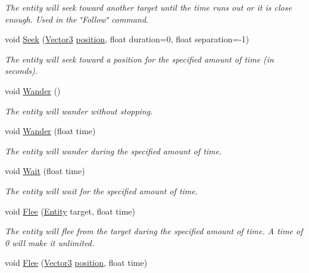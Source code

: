 \begin{DoxyCompactItemize}
\begin{DoxyCompactList}\small\item\em The entity will seek toward another target until the time runs out or it is close enough. Used in the \char`\"{}\+Follow\char`\"{} command. \end{DoxyCompactList}\item 
void \mbox{\hyperlink{class_lua_1_1_entity_a1a0205dc1d6ab6ac54679970885490f9}{Seek}} (\mbox{\hyperlink{class_lua_1_1_vector3}{Vector3}} \mbox{\hyperlink{class_lua_1_1_entity_ad8bd97d98fddc9b89f8410512b502c3f}{position}}, float duration=0, float separation=-\/1)
\begin{DoxyCompactList}\small\item\em The entity will seek toward a position for the specified amount of time (in seconds). \end{DoxyCompactList}\item 
void \mbox{\hyperlink{class_lua_1_1_entity_aa4d1d044edd1f9b9dfb4b310c49b8761}{Wander}} ()
\begin{DoxyCompactList}\small\item\em The entity will wander without stopping. \end{DoxyCompactList}\item 
void \mbox{\hyperlink{class_lua_1_1_entity_a9858a940de17a0405da24bff1d834970}{Wander}} (float time)
\begin{DoxyCompactList}\small\item\em The entity will wander during the specified amount of time. \end{DoxyCompactList}\item 
void \mbox{\hyperlink{class_lua_1_1_entity_a58a5bb200f7182dea5e622f036f05bf3}{Wait}} (float time)
\begin{DoxyCompactList}\small\item\em The entity will wait for the specified amount of time. \end{DoxyCompactList}\item 
void \mbox{\hyperlink{class_lua_1_1_entity_af1290dfaf8e3da8c2adb7279359bf036}{Flee}} (\mbox{\hyperlink{class_lua_1_1_entity}{Entity}} target, float time)
\begin{DoxyCompactList}\small\item\em The entity will flee from the target during the specified amount of time. A time of 0 will make it unlimited. \end{DoxyCompactList}\item 
void \mbox{\hyperlink{class_lua_1_1_entity_a334e63b56e1c78e6dbebd4dd9c48a69e}{Flee}} (\mbox{\hyperlink{class_lua_1_1_vector3}{Vector3}} \mbox{\hyperlink{class_lua_1_1_entity_ad8bd97d98fddc9b89f8410512b502c3f}{position}}, float time)

\end{DoxyCompactItemize}
